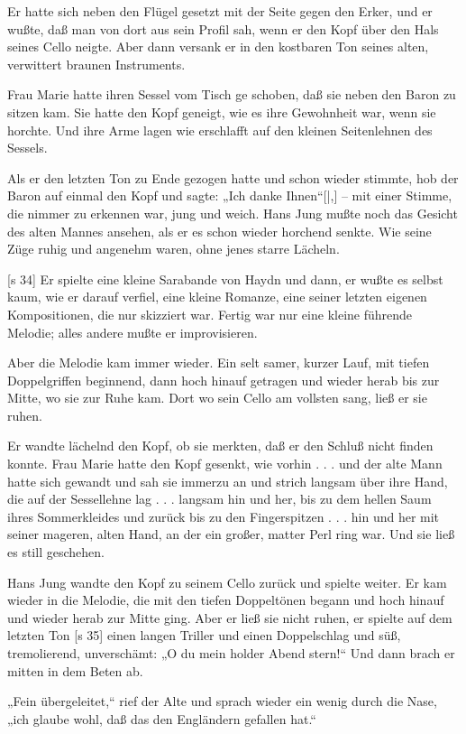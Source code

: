 Er hatte sich neben den Flügel gesetzt mit der
Seite gegen den Erker, und er wußte, daß man von
dort aus sein Profil sah, wenn er den Kopf über den
Hals seines Cello neigte. Aber dann versank er in
den kostbaren Ton seines alten, verwittert braunen
Instruments.

Frau Marie hatte ihren Sessel vom Tisch ge­
schoben, daß sie neben den Baron zu sitzen kam.
Sie hatte den Kopf geneigt, wie es ihre Gewohnheit
war, wenn sie horchte. Und ihre Arme lagen wie
erschlafft auf den kleinen Seitenlehnen des Sessels.

Als er den letzten Ton zu Ende gezogen hatte
und schon wieder stimmte, hob der Baron auf einmal
den Kopf und sagte: „Ich danke Ihnen“[|,] – mit einer
Stimme, die nimmer zu erkennen war, jung und weich.
Hans Jung mußte noch das Gesicht des alten Mannes
ansehen, als er es schon wieder horchend senkte.
Wie seine Züge ruhig und angenehm waren, ohne
jenes starre Lächeln.

[s 34]
Er spielte eine kleine Sarabande von Haydn
und dann, er wußte es selbst kaum, wie er darauf
verfiel, eine kleine Romanze, eine seiner letzten eigenen
Kompositionen, die nur skizziert war. Fertig war
nur eine kleine führende Melodie; alles andere mußte
er improvisieren.

Aber die Melodie kam immer wieder. Ein selt­
samer, kurzer Lauf, mit tiefen Doppelgriffen beginnend,
dann hoch hinauf getragen und wieder herab bis zur
Mitte, wo sie zur Ruhe kam. Dort wo sein Cello
am vollsten sang, ließ er sie ruhen.

Er wandte lächelnd den Kopf, ob sie merkten,
daß er den Schluß nicht finden konnte. Frau Marie
hatte den Kopf gesenkt, wie vorhin . . . und der
alte Mann hatte sich gewandt und sah sie immerzu
an und strich langsam über ihre Hand, die auf der
Sessellehne lag . . . langsam hin und her, bis zu
dem hellen Saum ihres Sommerkleides und zurück
bis zu den Fingerspitzen . . . hin und her mit seiner
mageren, alten Hand, an der ein großer, matter Perl­
ring war. Und sie ließ es still geschehen.

Hans Jung wandte den Kopf zu seinem Cello
zurück und spielte weiter. Er kam wieder in die
Melodie, die mit den tiefen Doppeltönen begann und
hoch hinauf und wieder herab zur Mitte ging. Aber
er ließ sie nicht ruhen, er spielte auf dem letzten Ton
[s 35]
einen langen Triller und einen Doppelschlag und süß,
tremolierend, unverschämt: „O du mein holder Abend­
stern!“ Und dann brach er mitten in dem Beten ab.

„Fein übergeleitet,“ rief der Alte und sprach
wieder ein wenig durch die Nase, „ich glaube wohl,
daß das den Engländern gefallen hat.“

